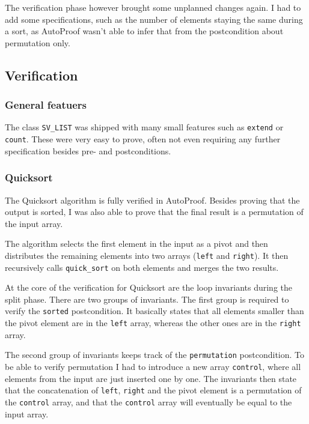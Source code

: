\documentclass[a4paper,10pt]{article}
\begin{document}
The verification phase however brought some unplanned changes again.
I had to add some specifications, such as the number of elements staying the same during a sort, 
as AutoProof wasn't able to infer that from the postcondition about permutation only.

\subsection{Verification}

\subsubsection{General featuers}
The class \lstinline!SV_LIST! was shipped with many small features such as \lstinline!extend! or \lstinline!count!.
These were very easy to prove, often not even requiring any further specification besides pre- and postconditions.

\subsubsection{Quicksort}

The Quicksort algorithm is fully verified in AutoProof.
Besides proving that the output is sorted, I was also able to prove that the final result is a permutation of the input array.

The algorithm selects the first element in the input as a pivot and then distributes the remaining elements into two arrays (\lstinline!left! and \lstinline!right!).
It then recursively calls \lstinline!quick_sort! on both elements and merges the two results.

At the core of the verification for Quicksort are the loop invariants during the split phase.
There are two groups of invariants.
The first group is required to verify the \lstinline!sorted! postcondition.
It basically states that all elements smaller than the pivot element are in the \lstinline!left! array, whereas the other ones are in the \lstinline!right! array.

The second group of invariants keeps track of the \lstinline!permutation! postcondition.
To be able to verify permutation I had to introduce a new array \lstinline!control!, where all elements from the input are just inserted one by one.
The invariants then state that the concatenation of \lstinline!left!, \lstinline!right! and the pivot element is a permutation of the \lstinline!control! array,
and that the \lstinline!control! array will eventually be equal to the input array.
\end{document}
